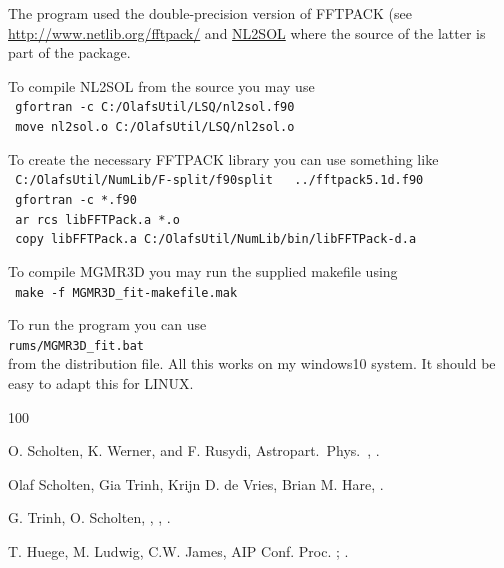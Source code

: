 \documentclass[pdftex,dvipsnames,usenames,fleqn,12pt]{article}
\begin{document}
The program used the double-precision version of FFTPACK (see \href{http://www.netlib.org/fftpack/}{http://www.netlib.org/fftpack/} and \href{http://people.sc.fsu.edu/~jburkardt/f_src/nl2sol/nl2sol.html}{NL2SOL} where the source of the latter is part of the package.

To compile NL2SOL from the source you may use
\\\verb< gfortran -c C:/OlafsUtil/LSQ/nl2sol.f90<
\\\verb< move nl2sol.o C:/OlafsUtil/LSQ/nl2sol.o<

To create the necessary FFTPACK library you can use something like
\\\verb< C:/OlafsUtil/NumLib/F-split/f90split   ../fftpack5.1d.f90<
\\\verb< gfortran -c *.f90<
\\\verb< ar rcs libFFTPack.a *.o<
\\\verb< copy libFFTPack.a C:/OlafsUtil/NumLib/bin/libFFTPack-d.a<

To compile MGMR3D you may run the supplied makefile using
\\\verb< make -f MGMR3D_fit-makefile.mak<

To run the program you can use
\\\verb<rums/MGMR3D_fit.bat<
\\from the distribution file.
All this works on my windows10 system. It should be easy to adapt this for LINUX.



\begin{thebibliography}{100}
  \setlength{\itemsep}{1pt}
  \setlength{\parskip}{0pt}
  \setlength{\parsep}{0pt}
  \small

 O. Scholten, K. Werner, and F. Rusydi,  Astropart.\ Phys.\ , .

 Olaf Scholten, Gia Trinh, Krijn D. de Vries, Brian M. Hare,
     .

 G. Trinh, O. Scholten, \etal,  , .

 T. Huege, M. Ludwig, C.W. James, AIP Conf. Proc. ; .


\end{thebibliography}
\end{document}
